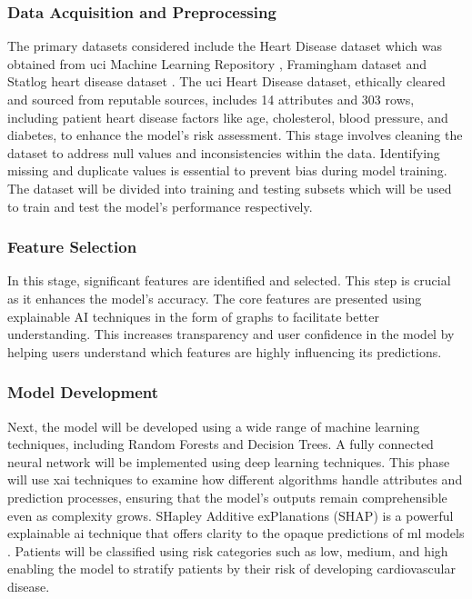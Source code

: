 \subsubsection{Data Acquisition and Preprocessing}
The primary datasets considered include the Heart Disease dataset which was obtained from \gls{uci} Machine Learning Repository \citep{janosi1989heart}, Framingham dataset \cite{kaggle2023framingham} and Statlog heart disease dataset \citep{uci2023statlog}. The \gls{uci} Heart Disease dataset, ethically cleared and sourced from reputable sources, includes 14 attributes and 303 rows, including patient heart disease factors like age, cholesterol, blood pressure, and diabetes, to enhance the model's risk assessment. This stage involves cleaning the dataset to address null values and inconsistencies within the data. Identifying missing and duplicate values is essential to prevent bias during model training. The dataset will be divided into training and testing subsets which will be used to train and test the model's performance respectively.

\subsubsection{Feature Selection} In this stage, significant features are identified and selected. This step is crucial as it enhances the model’s accuracy. The core features are presented using explainable AI techniques in the form of graphs to facilitate better understanding. This increases transparency and user confidence in the model by helping users understand which features are highly influencing its predictions.

\subsubsection{Model Development} Next, the model will be developed using a wide range of machine learning techniques, including Random Forests and Decision Trees. A fully connected neural network will be implemented using deep learning techniques. This phase will use \gls{xai} techniques to examine how different algorithms handle attributes and prediction processes, ensuring that the model's outputs remain comprehensible even as complexity grows. SHapley Additive exPlanations (SHAP) is a powerful explainable \gls{ai} technique that offers clarity to the opaque predictions of \gls{ml} models \citep{yasunobu2022shapley}. Patients will be classified using risk categories such as low, medium, and high enabling the model to stratify patients by their risk of developing cardiovascular disease. 

